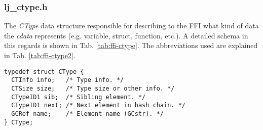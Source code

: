 \subsubsection{lj\_ctype.h}
The \emph{CType} data structure responsible for describing to the FFI
what kind of data the \emph{cdata} represents (e.g. variable, struct,
function, etc.). A detailed schema in this regards is shown in Tab. \ref{tab:ffi-ctype}. The abbreviations used are explained in Tab. \ref{tab:ffi-ctype2}.
\begin{lstlisting}[style=CStyle]
typedef struct CType {
  CTInfo info;   /* Type info. */
  CTSize size;   /* Type size or other info. */
  CTypeID1 sib;  /* Sibling element. */
  CTypeID1 next; /* Next element in hash chain. */
  GCRef name;    /* Element name (GCstr). */
} CType;
\end{lstlisting}

